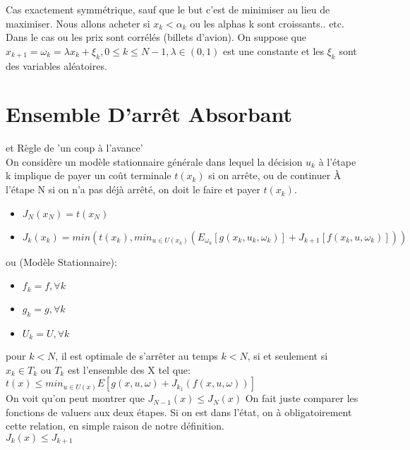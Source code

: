 \documentclass[oneside]{book}
\begin{document}
Cas exactement symmétrique, sauf que le but c'est de minimiser au lieu de maximiser. Nous allons acheter si $x_k < \alpha_k$ ou les alphas k sont croissants.. etc.\\

Dans le cas ou les prix sont corrélés (billets d'avion). On suppose que $x_{k+1} = \omega_k = \lambda x_k + \xi_k, 0 \leq k \leq N-1, \lambda \in (0,1)$ est une constante et les $\xi_k$ sont des variables aléatoires. 

\section{Ensemble D'arrêt Absorbant}
et Règle de 'un coup à l'avance'\\

On considère un modèle stationnaire générale dans lequel la décision $u_k$ à l'étape k implique de payer un coût terminale $t(x_k)$ si on arrête, ou de continuer À l'étape N si on n'a pas déjà arrêté, on doit le faire et payer $t(x_k)$. \\
\begin{itemize}
\item $J_N(x_N) = t(x_N)$\\
\item $J_k(x_k) =  min(t(x_k), min_{u \in U(x_k)}(E_{\omega_k}[g(x_k,u_k,\omega_k)] + J_{k+1}[f(x_k,u,\omega_k)]))$
\end{itemize}

ou (Modèle Stationnaire):
\begin{itemize}
\item $f_k = f, \forall k$
\item $g_k = g, \forall k$
\item $U_k = U, \forall k$
\end{itemize}


pour $k < N$, il est optimale de s'arrêter au temps $k<N$, si et seulement si $x_k \in T_k$ ou $T_k$ est l'ensemble des X tel que:\\

$t(x) \leq min_{u \in U(x)}E[g(x,u,\omega) + J_{k_1}(f(x,u,\omega))]$\\

On voit qu'on peut montrer que $J_{N-1}(x) \leq J_N(x)$ On fait juste comparer les fonctions de valuers aux deux étapes. Si on est dans l'état, on à obligatoirement cette relation, en simple raison de notre définition. \\

$J_k(x) \leq J_{k+1}$\\
\end{document}
